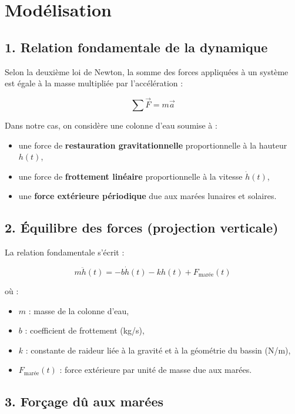 \documentclass[a4paper,12pt,oneside]{article}
\begin{document}
\section{Modélisation}

\subsection*{1. Relation fondamentale de la dynamique}

Selon la deuxième loi de Newton, la somme des forces appliquées à un système est égale à la masse multipliée par l'accélération :

\[
\sum \vec{F} = m \vec{a}
\]

Dans notre cas, on considère une colonne d’eau soumise à :

\begin{itemize}
    \item une force de \textbf{restauration gravitationnelle} proportionnelle à la hauteur \( h(t) \),
    \item une force de \textbf{frottement linéaire} proportionnelle à la vitesse \( \dot{h}(t) \),
    \item une \textbf{force extérieure périodique} due aux marées lunaires et solaires.
\end{itemize}

\subsection*{2. Équilibre des forces (projection verticale)}

La relation fondamentale s’écrit :

\[
m \ddot{h}(t) = -b \dot{h}(t) - k h(t) + F_{\text{marée}}(t)
\]

où :
\begin{itemize}
    \item \( m \) : masse de la colonne d’eau,
    \item \( b \) : coefficient de frottement (kg/s),
    \item \( k \) : constante de raideur liée à la gravité et à la géométrie du bassin (N/m),
    \item \( F_{\text{marée}}(t) \) : force extérieure par unité de masse due aux marées.
\end{itemize}

\subsection*{3. Forçage dû aux marées}
\end{document}

